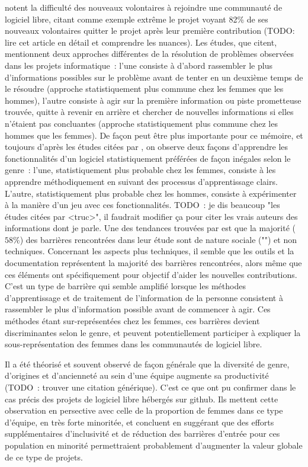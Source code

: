  notent la difficulté des nouveaux volontaires à rejoindre une communauté de
logiciel libre, citant comme exemple extrême le projet  voyant 82\% de ses nouveaux
volontaires quitter le projet après leur première contribution  (TODO: lire
cet article en détail et comprendre les nuances). Les études, que \textcite[p.~1005]{barriers-2018} citent,
mentionnent deux approches différentes de la résolution de problèmes observées dans les projets informatique :
l'une consiste à d'abord rassembler le plus d'informations possibles sur le problème avant de tenter en un
deuxième temps de le résoudre (approche statistiquement plus commune chez les femmes que les hommes), l'autre
consiste à agir sur la première information ou piste prometteuse trouvée, quitte à revenir en arrière et
chercher de nouvelles informations si elles n'étaient pas concluantes (approche statistiquement plus commune
chez les hommes que les femmes). De façon peut être plus importante pour ce mémoire, et toujours d'après les
études citées par \textcite[p.~1005]{barriers-2018}, on observe deux façons d'apprendre les fonctionnalités
d'un logiciel statistiquement préférées de façon inégales selon le genre : l'une, statistiquement plus
probable chez les femmes, consiste à les apprendre méthodiquement en suivant des processus d'apprentissage
clairs. L'autre, statistiquement plus probable chez les hommes, consiste à expérimenter à la manière d'un jeu
avec ces fonctionnalités. TODO : je dis beaucoup "les études citées par <truc>", il faudrait modifier ça pour
citer les vrais auteurs des informations dont je parle. Une des tendances trouvées par
\textcite[p.~1008]{barriers-2018} est que la majorité ($58\%$) des barrières rencontrées dans leur étude sont
de nature sociale ("") et non techniques. Concernant les aspects plus techniques, il
semble que les outils et la documentation représentent la majorité des barrières rencontrées, alors même que
ces éléments ont spécifiquement pour objectif d'aider les nouvelles contributions. C'est un type de barrière
qui semble amplifié lorsque les méthodes d'apprentissage et de traitement de l'information de la personne
consistent à rassembler le plus d'information possible avant de commencer à agir. Ces méthodes étant
sur-représentées chez les femmes, ces barrières devient discriminantes selon le genre, et peuvent
potentiellement participer à expliquer la sous-représentation des femmes dans les communautés de logiciel
libre.

Il a été théorisé et souvent observé de façon générale que la diversité de genre, d'origines et d'ancienneté
au sein d'une équipe augmente sa productivité (TODO : trouver une citation générique). C'est ce que
 ont pu confirmer dans le cas précis des projets de logiciel libre hébergés sur
\gls{github}. Ils mettent cette observation en persective avec celle de la proportion de
femmes dans ce type d'équipe, en très forte minoritée, et concluent en suggérant que des efforts
supplémentaires d'inclusivité et de réduction des barrières d'entrée pour ces population en minorité
permettraient probablement d'augmenter la valeur globale de ce type de projets.

